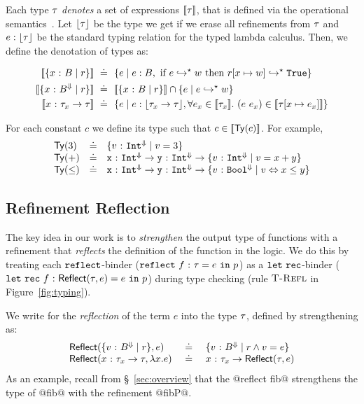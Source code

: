 %
Each type $\tau$ \emph{denotes} a set of expressions $[\![\tau]\!]$,
that is defined via the operational semantics~\cite{Knowles10}.
%
Let $\lfloor \tau \rfloor$ be the type we get if we erase all refinements
from $\tau$ and $e : \lfloor \tau \rfloor$ be the
standard typing relation for the typed lambda calculus.
%
Then, we define the denotation of types as:

\begin{align*}
\interp{\tref{x}{\btyp}{r}} \defeq &\
  \{ e \mid  \bhastype{}{e}{\btyp}
           , \mbox{ if } \evalsto{e}{w} \mbox{ then } \evalsto{r\subst{x}{w}}{\etrue}
  \}\\
\interp{\tref{x}{\btyp^\tlabel}{r}} \defeq &\
  \interp{\tref{x}{\btyp}{r}} \cap \{ e \mid  \evalsto{e}{w}\}\\
\interp{\tfun{x}{\typ_x}{\typ}} \defeq &\
  \{ e \mid \bhastype{}{e}{\shape{\tfunbasic{\typ_x}{\typ}}}
           , \forall e_x \in \interp{\typ_x}.\ (\eapp{e}{e_x}) \in \interp{\typ\subst{x}{e_x}}
  \}
\end{align*}


For each constant $c$ we define its type 
such that $c \in [\![\mathsf{Ty}({c})]\!]$.
%
For example,
%
$$
\begin{array}{lcl}
\mathsf{Ty}({3}) &\doteq& \{ {v} \ \text{:}\ {\mathtt{Int}^\Downarrow} \mid v = 3 \}\\
\mathsf{Ty}({+}) &\doteq& {\mathtt{x}} \ \text{:}\ {\mathtt{Int}^\Downarrow} \rightarrow {\mathtt{y}} \ \text{:}\ {\mathtt{Int}^\Downarrow} \rightarrow \{ {v} \ \text{:}\ {\mathtt{Int}^\Downarrow} \mid v = x + y \}\\
\mathsf{Ty}({\leq}) &\doteq& {\mathtt{x}} \ \text{:}\ {\mathtt{Int}^\Downarrow} \rightarrow {\mathtt{y}} \ \text{:}\ {\mathtt{Int}^\Downarrow} \rightarrow \{ {v} \ \text{:}\ {\mathtt{Bool}^\Downarrow} \mid v \Leftrightarrow x \leq y \}\\
\end{array}
$$


\subsection{Refinement Reflection}\label{subsec:logicalannotations}
%
The key idea in our work is to
\emph{strengthen} the output type of functions
with a refinement that \emph{reflects} the
definition of the function in the logic.
%
We do this by treating each
%
$\mathtt{reflect}$-binder
%
(${{\mathtt{reflect}}\ {f} \ \text{:}\ {\tau} = e\ \mathtt{in}\ {p}}$)
%
as a $\mathtt{let\ rec}$-binder
%
(${{\mathtt{let\ rec}}\ {f} \ \text{:}\ {\mathsf{Reflect}(\tau, e)} = e\ \mathtt{in}\ {p}}$)
%
during type checking (rule $\textsc{T-Refl}$ in Figure~\ref{fig:typing}).

%
We write  for the \emph{reflection}
of the term $e$ into the type $\tau$,  defined by strengthening
\typ as:
%
$$
\begin{array}{lcl}
\mathsf{Reflect}(\{ {v} \ \text{:}\ {B{^\Downarrow}} \mid r \}, e)
  & \ \doteq\ 
  & \{ {v} \ \text{:}\ {B{^\Downarrow}} \mid r \land v = e \}\\
\mathsf{Reflect}({x} \ \text{:}\ {\tau_x} \rightarrow \tau, \lambda x. e)
  & \ \doteq\ 
  & {x} \ \text{:}\ {\tau_x} \rightarrow \mathsf{Reflect}(\tau, e)
\end{array}
$$
%
As an example, recall from \S~\ref{sec:overview}
that the @reflect fib@ strengthens the type of
@fib@ with the refinement @fibP@.

